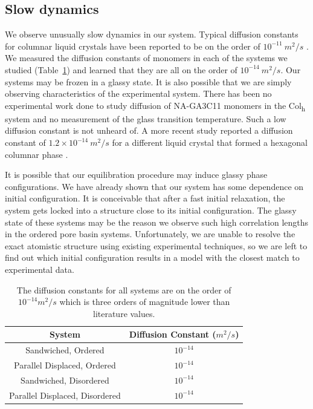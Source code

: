 \documentclass[journal=jpcbfk,manusciprt=article]{achemso}
\begin{document}
  \subsection{Slow dynamics}

  We observe unusually slow dynamics in our system. Typical diffusion constants
  for columnar liquid crystals have been reported to be on the order of
  $10^{-11}~ m^2/s$ \cite{dong_translational_1984}. We measured the diffusion
  constants of monomers in each of the systems we studied (Table~\ref{table:msd})
  and learned that they are all on the order of $10^{-14}~m^2/s$. Our systems may
  be frozen in a glassy state. It is also possible that we are simply observing
  characteristics of the experimental system. There has been no experimental work
  done to study diffusion of NA-GA3C11 monomers in the Col\textsubscript{h}
  system and no measurement of the glass transition temperature. Such a low
  diffusion constant is not unheard of. A more recent study reported a diffusion
  constant of $1.2\times10^{-14}~m^2/s$ for a different liquid crystal that
  formed a hexagonal columnar phase \cite{dvinskikh_molecular_2002}. 

  It is possible that our equilibration procedure may induce glassy phase
  configurations. We have already shown that our system has some dependence on
  initial configuration. It is conceivable that after a fast initial relaxation,
  the system gets locked into a structure close to its initial configuration.
  The glassy state of these systems may be the reason we observe such high
  correlation lengths in the ordered pore basin systems.  Unfortunately, we are
  unable to resolve the exact atomistic structure using existing experimental
  techniques, so we are left to find out which initial configuration results in a
  model with the closest match to experimental data.

  \begin{table}[h]
  \centering
  \begin{tabular}{cc}
  \toprule
  System & Diffusion Constant ($m^2/s$) \\ 
  \midrule
  Sandwiched, Ordered & $10^{-14}$ \\
  Parallel Displaced, Ordered & $10^{-14}$ \\
  Sandwiched, Disordered & $10^{-14}$ \\
  Parallel Displaced, Disordered & $10^{-14}$ \\
  \bottomrule
  \end{tabular}
  \caption{The diffusion constants for all systems are on the order of $10^{-14} m^2/s$ 
  which is three orders of magnitude lower than literature values.}~\label{table:msd}
  \end{table}
\end{document}
